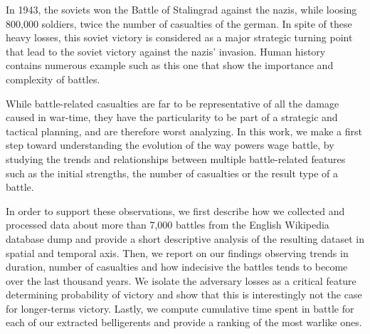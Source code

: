 In 1943, the soviets won the Battle of Stalingrad against the nazis, while loosing 800,000 soldiers, twice the number of casualties of the german. In spite of these heavy losses, this soviet victory is considered as a major strategic turning point that lead to the soviet victory against the nazis' invasion. Human history contains numerous example such as this one that show the importance and complexity of battles.

While battle-related casualties are far to be representative of all the damage caused in war-time, they have the particularity to be part of a strategic and tactical planning, and are therefore worst analyzing. In this work, we make a first step toward understanding the evolution of the way powers wage battle, by studying the trends and relationships between multiple battle-related features such as the initial strengths, the number of casualties or the result type of a battle. 

In order to support these observations, we first describe how we collected and processed data about more than 7,000 battles from the English Wikipedia database dump\cite{wikipedia_dump} and provide a short descriptive analysis of the resulting dataset in spatial and temporal axis. Then, we report on our findings observing trends in duration, number of casualties and how indecisive the battles tends to become over the last thousand years. We isolate the adversary losses as a critical feature determining probability of victory and show that this is interestingly not the case for longer-terms victory. Lastly, we compute cumulative time spent in battle for each of our extracted belligerents and provide a ranking of the most warlike ones.  
